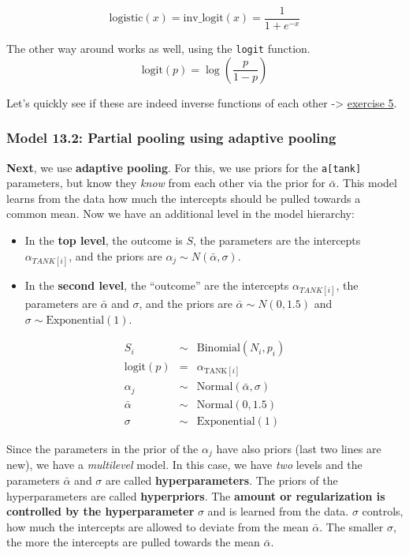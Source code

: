 \documentclass[
]{book}
\providecommand{\tightlist}{%
  \setlength{\itemsep}{0pt}\setlength{\parskip}{0pt}}
\begin{document}
\[
\mathrm{logistic}(x) = \mathrm{inv\_logit}(x) = \frac{1}{1 + e^{-x}}
\]

The other way around works as well, using the \texttt{logit} function.
\[\text{logit}(p) = \log\left( \frac{p}{1 - p} \right)\]

Let's quickly see if these are indeed inverse functions of each other -\textgreater{} \hyperref[exercise5_LMM]{exercise 5}.

\subsubsection{Model 13.2: Partial pooling using adaptive pooling}\label{model13_2}

\textbf{Next}, we use \textbf{adaptive pooling}. For this, we use priors for the \texttt{a{[}tank{]}} parameters,
but know they \emph{know} from each other via the prior for \(\bar{\alpha}\).
This model learns from the data how much the intercepts should be pulled towards a common mean.
Now we have an additional level in the model hierarchy:

\begin{itemize}
\tightlist
\item
  In the \textbf{top level}, the outcome is \(S\), the parameters are the intercepts
  \(\alpha_{TANK[i]}\),
  and the priors are \(\alpha_j \sim N(\bar{\alpha}, \sigma)\).
\item
  In the \textbf{second level}, the ``outcome'' are the intercepts \(\alpha_{TANK[i]}\),
  the parameters are \(\bar{\alpha}\) and \(\sigma\),
  and the priors are \(\bar{\alpha} \sim N(0, 1.5)\) and
  \(\sigma \sim \text{Exponential}(1)\).
\end{itemize}

\[
\begin{array}{rcl}
S_i &\sim& \text{Binomial}(N_i, p_i) \\
\text{logit}(p) &=& \alpha_{\text{TANK}[i]} \\
\alpha_j &\sim& \text{Normal}(\bar{\alpha}, \sigma)\\
\bar{\alpha} &\sim& \text{Normal}(0, 1.5)\\
\sigma &\sim& \text{Exponential}(1)
\end{array}
\]

Since the parameters in the prior of the \(\alpha_j\) have also priors
(last two lines are new), we have a \emph{multilevel} model.
In this case, we have \emph{two} levels and the parameters
\(\bar{\alpha}\) and \(\sigma\) are called \textbf{hyperparameters}.
The priors of the hyperparameters are called \textbf{hyperpriors}.
The \textbf{amount or regularization is controlled by the hyperparameter} \(\sigma\) and is
learned from the data. \(\sigma\) controls, how much the intercepts are
allowed to deviate from the mean \(\bar{\alpha}\). The smaller \(\sigma\),
the more the intercepts are pulled towards the mean \(\bar{\alpha}\).
\end{document}
